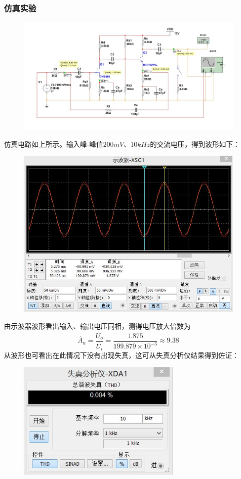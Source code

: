 \documentclass[12pt,a4paper]{article}
\begin{document}
\begin{spacing}{1.3}
\subsubsection{仿真实验}
\begin{figure}[H]
\centering
\includegraphics[width=\textwidth]{7.jpg}
\end{figure}
仿真电路如上所示。输入峰-峰值$200mV、10kHz$的交流电压，得到波形如下：
\begin{figure}[H]
\centering
\includegraphics[width=\textwidth]{8.jpg}
\end{figure}
由示波器波形看出输入、输出电压同相，测得电压放大倍数为
\[
\dot{A_u} = \frac{\dot{U_o}}{\dot{U_i}} = \frac{1.875}{199.879\times 10^{-3}} \approx 9.38
\]
从波形也可看出在此情况下没有出现失真，这可从失真分析仪结果得到佐证：
\begin{figure}[H]
\centering
\includegraphics[width=8cm]{9.jpg}

\end{figure}
\end{spacing}
\end{document}
